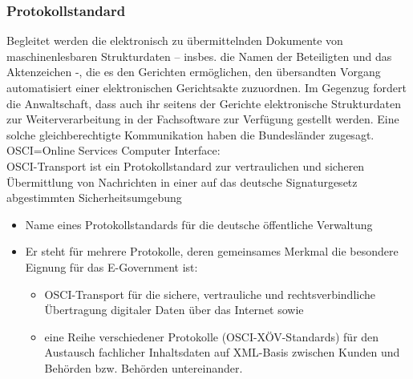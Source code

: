 \subsubsection{Protokollstandard}
Begleitet werden die elektronisch zu übermittelnden Dokumente von maschinenlesbaren Strukturdaten – insbes. die Namen der Beteiligten und das Aktenzeichen -, die es den Gerichten ermöglichen, den übersandten Vorgang automatisiert einer elektronischen Gerichtsakte zuzuordnen. Im Gegenzug fordert die Anwaltschaft, dass auch ihr seitens der Gerichte elektronische Strukturdaten zur Weiterverarbeitung in der Fachsoftware zur Verfügung gestellt werden. Eine solche gleichberechtigte Kommunikation haben die Bundesländer zugesagt.\\
OSCI=Online Services Computer Interface:\\
OSCI-Transport ist ein Protokollstandard zur vertraulichen und sicheren Übermittlung von Nachrichten in einer auf das deutsche Signaturgesetz abgestimmten Sicherheitsumgebung
\begin{itemize}
\item Name eines Protokollstandards für die deutsche öffentliche Verwaltung
\item Er steht für mehrere Protokolle, deren gemeinsames Merkmal die besondere Eignung für das E-Government ist:
\begin{itemize}
\item OSCI-Transport für die sichere, vertrauliche und rechtsverbindliche Übertragung digitaler Daten über das Internet sowie
\item eine Reihe verschiedener Protokolle (OSCI-XÖV-Standards) für den Austausch fachlicher Inhaltsdaten auf XML-Basis zwischen Kunden und Behörden bzw. Behörden untereinander.
\end{itemize}
\end{itemize}

